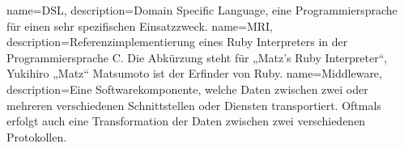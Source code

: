 {
  name=DSL,
  description={Domain Specific Language, eine Programmiersprache für einen sehr
               spezifischen Einsatzzweck.}
}
{
  name=MRI,
  description={Referenzimplementierung eines Ruby Interpreters in der
               Programmiersprache C. Die Abkürzung steht für „Matz's Ruby
               Interpreter“, Yukihiro „Matz“ Matsumoto ist der Erfinder von
               Ruby.}
}
{
  name=Middleware,
  description={Eine Softwarekomponente, welche Daten zwischen zwei oder
               mehreren verschiedenen Schnittstellen oder Diensten
               transportiert. Oftmals erfolgt auch eine Transformation
               der Daten zwischen zwei verschiedenen Protokollen.}
}
